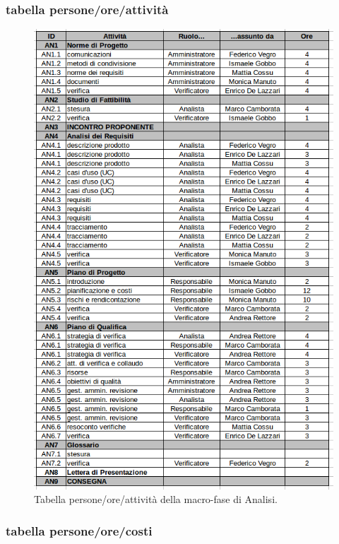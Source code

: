 \newpage
\subsubsection{tabella persone/ore/attività}

\begin{figure}[h]
\begin{center}
\includegraphics[scale=0.57]{img/analisi-attivita.png}
\caption{Tabella persone/ore/attività della macro-fase di Analisi.}
\end{center}
\end{figure}
\clearpage

\subsubsection{tabella persone/ore/costi}


